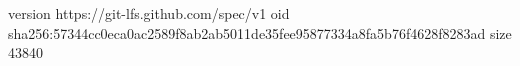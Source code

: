version https://git-lfs.github.com/spec/v1
oid sha256:57344cc0eca0ac2589f8ab2ab5011de35fee95877334a8fa5b76f4628f8283ad
size 43840
